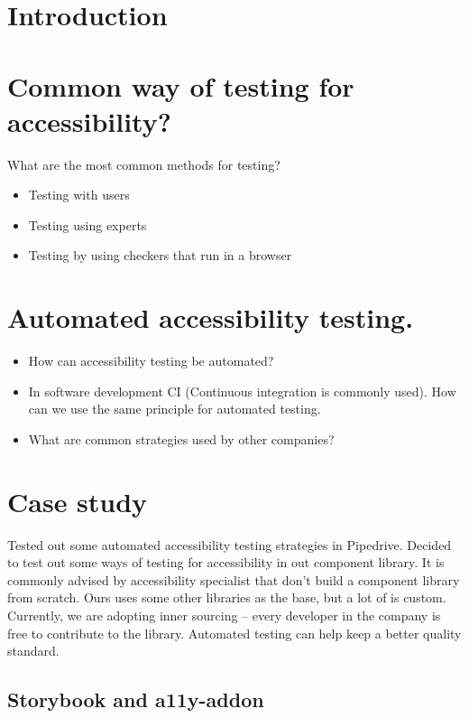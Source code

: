 \documentclass{master_thesis}
\begin{document}

\section{Introduction}


\section{Common way of testing for accessibility?}
What are the most common methods for testing?\\
\begin{itemize}
	\item Testing with users
	\item Testing using experts
	\item Testing by using checkers that run in a browser
\end{itemize}

\section{Automated accessibility testing.}

\begin{itemize}
	\item How can accessibility testing be automated?
	\item In software development CI (Continuous integration is commonly used). How can we use the same principle for automated testing.
	\item What are common strategies used by other companies?
\end{itemize}

\section{Case study}

Tested out some automated accessibility testing strategies in Pipedrive.
Decided to test out some ways of testing for accessibility in out component library. It is commonly advised by accessibility specialist that don't build a component library from scratch. Ours uses some other libraries as the base, but a lot of is custom. Currently, we are adopting inner sourcing – every developer in the company is free to contribute to the library. Automated testing can help keep a better quality standard.

\subsection{Storybook and a11y-addon}
\end{document}
